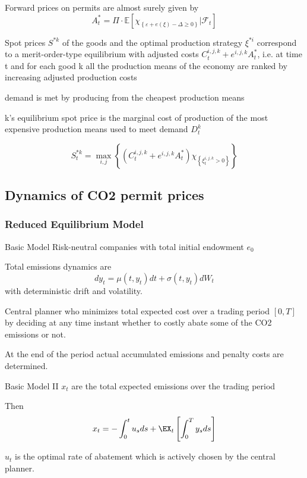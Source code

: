 	Forward prices on permits are almost surely given by 
		\[
		A^*_t = \Pi \cdot \mathbb{E} \left[ \chi_{\left\{ \varepsilon + e(\xi) - \Delta \ge 0 \right\}} | \mathcal{F}_t \right]
		\]

	Spot prices $S^{*k}$ of the goods and the optimal production strategy $\xi^{*i}$ correspond to a merit-order-type
	equilibrium with adjusted costs $C_t^{i,j,k} + e^{i,j,k} A_t^*$, i.e. at time t and for each good k
		all the production means of the economy are ranked by increasing adjusted production costs
	
		demand is met by producing from the cheapest production means
		
		k's equilibrium spot price is the marginal cost of production of the most expensive production means used to meet demand $D_t^k$

		\[
		S_t^{*k} = \max_{i,j} \left\{ \left(C_t^{i,j,k} + e^{i,j,k} A_t^* \right) \chi_{\left\{\xi_t^{i,j,k}>0\right\}}\right\}
		\]


\subsection{Dynamics of CO2 permit prices}
\subsubsection{Reduced Equilibrium Model}

Basic Model
	Risk-neutral companies with total initial endowment $e_0$
	
	Total emissions dynamics are
		\begin{equation}
		dy_t= \mu(t, y_t)dt + \sigma(t, y_t)dW_t
		\end{equation}
	with deterministic drift and volatility.
	
	Central planner who minimizes total expected cost over a trading period $[0,T]$ by deciding at any time instant
	whether to costly abate some of the CO2 emissions or not.
	
	At the end of the period actual accumulated emissions and penalty costs are determined.


Basic Model II
	$x_t$ are the total expected emissions over the trading period
	
	Then
		\begin{equation}
		x_t=-\int_0^tu_s ds + \EX_t\left[\int_0^T y_s ds \right]
		\end{equation}
	
	$u_t$ is the optimal rate of abatement which is  actively chosen by the central planner.
	
